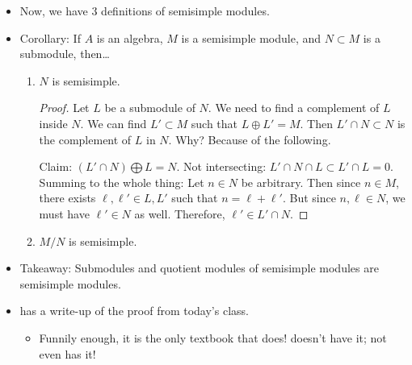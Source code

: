 \documentclass[../notes.tex]{subfiles}
\begin{document}
\begin{itemize}
\begin{proof}
        $(1\Rightarrow 3$): Let's take a submodule $N\subset M$. By 1, $M=\bigoplus_{i\in I}S_i$. Let's look a tall subsets $J$ such that
        \begin{equation*}
            N+\sum_{j\in J}S_j = N\oplus\left( \sum S_j \right)
        \end{equation*}
        Look at the maximal one by inclusion. Then once again, by the same proof strategy as above,
        \begin{equation*}
            N\oplus\underbrace{\left( \sum S_j \right)}_{N'} = M
        \end{equation*}\par
        $(3\Rightarrow 1)$: We use what we've learned about representations. Let $M=N_1\oplus N_2$. Then $N_2$, if nonsimple, has subsets $N_2\oplus N_3$. We can continue on and on. Because dimensions finitely decrease, we'll eventually have to arrive at a sum $N_1\oplus\cdots\oplus N_m$ of simples.
    \end{proof}
    \item Now, we have 3 definitions of semisimple modules.
    \item Corollary: If $A$ is an algebra, $M$ is a semisimple module, and $N\subset M$ is a submodule, then\dots
    \begin{enumerate}
        \item $N$ is semisimple.
        \begin{proof}
            Let $L$ be a submodule of $N$. We need to find a complement of $L$ inside $N$. We can find $L'\subset M$ such that $L\oplus L'=M$. Then $L'\cap N\subset N$ is the complement of $L$ in $N$. Why? Because of the following.\par
            Claim: $(L'\cap N)\bigoplus L=N$. Not intersecting: $L'\cap N\cap L\subset L'\cap L=0$. Summing to the whole thing: Let $n\in N$ be arbitrary. Then since $n\in M$, there exists $\ell,\ell'\in L,L'$ such that $n=\ell+\ell'$. But since $n,\ell\in N$, we must have $\ell'\in N$ as well. Therefore, $\ell'\in L'\cap N$.
        \end{proof}
        \item $M/N$ is semisimple.
    \end{enumerate}
    \item Takeaway: Submodules and quotient modules of semisimple modules are semisimple modules.
    \item \textcite{bib:Lang} has a write-up of the proof from today's class.
    \begin{itemize}
        \item Funnily enough, it is the only textbook that does! \textcite{bib:FultonHarris} doesn't have it; not even \textcite{bib:Etingof} has it!
    \end{itemize}
\end{itemize}
\end{document}
